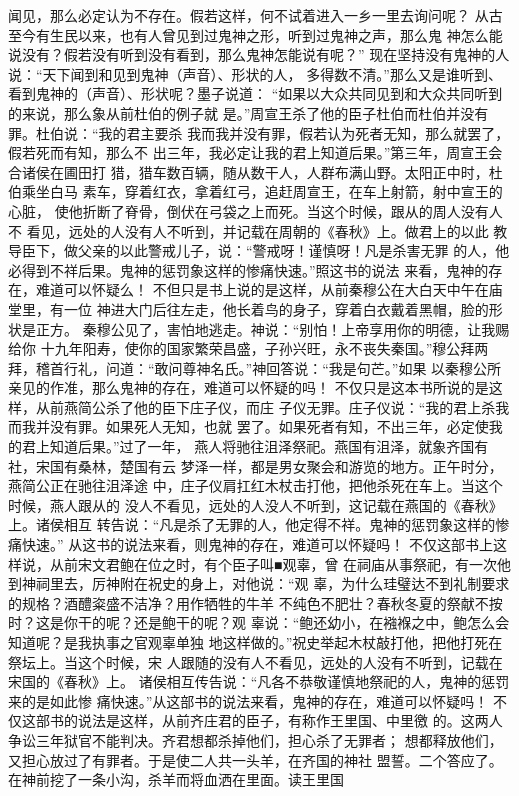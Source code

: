\documentclass[12pt,UTF8]{ctexbook}
\begin{document}
闻见，那么必定认为不存在。假若这样，何不试着进入一乡一里去询问呢？ 
从古至今有生民以来，也有人曾见到过鬼神之形，听到过鬼神之声，那么鬼 
神怎么能说没有？假若没有听到没有看到，那么鬼神怎能说有呢？” 
现在坚持没有鬼神的人说：“天下闻到和见到鬼神（声音）、形状的人， 
多得数不清。”那么又是谁听到、看到鬼神的（声音）、形状呢？墨子说道： 
“如果以大众共同见到和大众共同听到的来说，那么象从前杜伯的例子就 
是。”周宣王杀了他的臣子杜伯而杜伯并没有罪。杜伯说：“我的君主要杀 
我而我并没有罪，假若认为死者无知，那么就罢了，假若死而有知，那么不 
出三年，我必定让我的君上知道后果。”第三年，周宣王会合诸侯在圃田打 
猎，猎车数百辆，随从数干人，人群布满山野。太阳正中时，杜伯乘坐白马 
素车，穿着红衣，拿着红弓，追赶周宣王，在车上射箭，射中宣王的心脏， 
使他折断了脊骨，倒伏在弓袋之上而死。当这个时候，跟从的周人没有人不 
看见，远处的人没有人不听到，并记载在周朝的《春秋》上。做君上的以此 
教导臣下，做父亲的以此警戒儿子，说：“警戒呀！谨慎呀！凡是杀害无罪 
的人，他必得到不祥后果。鬼神的惩罚象这样的惨痛快速。”照这书的说法 
来看，鬼神的存在，难道可以怀疑么！ 
不但只是书上说的是这样，从前秦穆公在大白天中午在庙堂里，有一位 
神进大门后往左走，他长着鸟的身子，穿着白衣戴着黑帽，脸的形状是正方。 
秦穆公见了，害怕地逃走。神说：“别怕！上帝享用你的明德，让我赐给你 
十九年阳寿，使你的国家繁荣昌盛，子孙兴旺，永不丧失秦国。”穆公拜两 
拜，稽首行礼，问道：“敢问尊神名氏。”神回答说：“我是句芒。”如果 
以秦穆公所亲见的作准，那么鬼神的存在，难道可以怀疑的吗！ 
不仅只是这本书所说的是这样，从前燕简公杀了他的臣下庄子仪，而庄 
子仪无罪。庄子仪说：“我的君上杀我而我并没有罪。如果死人无知，也就 
罢了。如果死者有知，不出三年，必定使我的君上知道后果。”过了一年， 
燕人将驰往沮泽祭祀。燕国有沮泽，就象齐国有社，宋国有桑林，楚国有云 
梦泽一样，都是男女聚会和游览的地方。正午时分，燕简公正在驰往沮泽途 
中，庄子仪肩扛红木杖击打他，把他杀死在车上。当这个时候，燕人跟从的 
没人不看见，远处的人没人不听到，这记载在燕国的《春秋》上。诸侯相互 
转告说：“凡是杀了无罪的人，他定得不祥。鬼神的惩罚象这样的惨痛快速。” 
从这书的说法来看，则鬼神的存在，难道可以怀疑吗！ 
不仅这部书上这样说，从前宋文君鲍在位之时，有个臣子叫■观辜，曾 
在祠庙从事祭祀，有一次他到神祠里去，厉神附在祝史的身上，对他说：“观 
辜，为什么珪璧达不到礼制要求的规格？酒醴粢盛不洁净？用作牺牲的牛羊 
不纯色不肥壮？春秋冬夏的祭献不按时？这是你干的呢？还是鲍干的呢？观 
辜说：“鲍还幼小，在襁褓之中，鲍怎么会知道呢？是我执事之官观辜单独 
地这样做的。”祝史举起木杖敲打他，把他打死在祭坛上。当这个时候，宋 
人跟随的没有人不看见，远处的人没有不听到，记载在宋国的《春秋》上。 
诸侯相互传告说：“凡各不恭敬谨慎地祭祀的人，鬼神的惩罚来的是如此惨 
痛快速。”从这部书的说法来看，鬼神的存在，难道可以怀疑吗！ 
不仅这部书的说法是这样，从前齐庄君的臣子，有称作王里国、中里徼 
的。这两人争讼三年狱官不能判决。齐君想都杀掉他们，担心杀了无罪者； 
想都释放他们，又担心放过了有罪者。于是使二人共一头羊，在齐国的神社 
盟誓。二个答应了。在神前挖了一条小沟，杀羊而将血洒在里面。读王里国 
\end{document}
